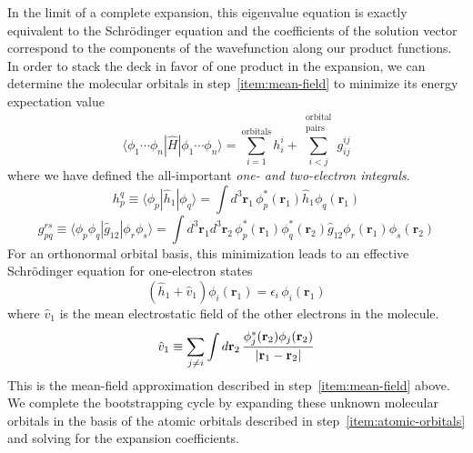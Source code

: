 In the limit of a complete expansion, this eigenvalue equation is exactly
equivalent to the Schr\"odinger equation and the coefficients of the solution
vector correspond to the components of the wavefunction along our product
functions.
In order to stack the deck in favor of one product in the expansion, we can
determine the molecular orbitals in step~\ref{item:mean-field} to minimize its
energy expectation value
\begin{equation}
    \label{eq:introduction:orbital-product-expectation-value}
    \langle \phi_1\cdots \phi_n|
    \hat{H}
    |\phi_1\cdots \phi_n \rangle
    =
    \sum_{i=1}^\mathrm{orbitals}
    h_i^i
    +
    \sum_{i<j}^{\substack{\mathrm{orbital}\\\mathrm{pairs}}}
    g_{ij}^{ij}
\end{equation}
where we have defined the all-important {\itshape one- and two-electron
integrals}.
\begin{equation}
    h_p^q
    \equiv
    \langle\phi_p|\hat{h}_1|\phi_q\rangle
    =
    \int
    d^3\mathbf{r}_1\,
    \phi_p^*(\mathbf{r}_1)
    \hat{h}_1
    \phi_q(\mathbf{r}_1)
\end{equation}
\begin{equation}
    g_{pq}^{rs}
    \equiv
    \langle\phi_p\phi_q|\hat{g}_{12}|\phi_r\phi_s\rangle
    =
    \int
    d^3\mathbf{r}_1
    d^3\mathbf{r}_2\,
    \phi_p^*(\mathbf{r}_1)
    \phi_q^*(\mathbf{r}_2)
    \hat{g}_{12}
    \phi_r(\mathbf{r}_1)
    \phi_s(\mathbf{r}_2)
\end{equation}
For an orthonormal orbital basis, this minimization leads to an effective
Schr\"odinger equation for one-electron states
\begin{equation}
    \label{eq:introduction:mean-field-orbitals}
    (
        \hat{h}_1
        +
        \hat{v}_1
    )
    \phi_i(\mathbf{r}_1)
    =
    \epsilon_i\,
    \phi_i(\mathbf{r}_1)
\end{equation}
where \(\hat{v}_1\) is the mean electrostatic field of the other electrons in
the molecule.
\begin{equation}
    \hat{v}_1
    \equiv
    \sum_{j\neq i}
    \int
    d\mathbf{r}_2\,
    \frac{%
        \phi_j^*(\mathbf{r}_2)\phi_j(\mathbf{r}_2)
    }{%
        |\mathbf{r}_1 - \mathbf{r}_2|
    }
\end{equation}
This is the mean-field approximation described in step~\ref{item:mean-field}
above.
We complete the bootstrapping cycle by expanding these unknown molecular
orbitals in the basis of the atomic orbitals described in
step~\ref{item:atomic-orbitals} and solving for the expansion coefficients.

